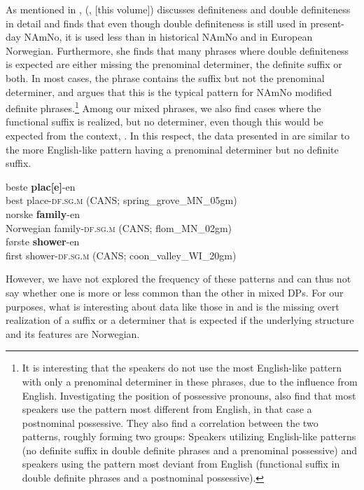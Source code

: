 \documentclass[output=paper]{langscibook}
\begin{document}
As mentioned in , \citeauthor{vanBaal2020} (\citeyear{vanBaal2020}, \citeyear{chapters/vanbaal} [this volume]) discusses definiteness and double definiteness in detail and finds that even though double definiteness is still used in present-day NAmNo, it is used less than in historical NAmNo and in European Norwegian. Furthermore, she finds that many phrases where double definiteness is expected are either missing the prenominal determiner, the definite suffix or both. In most cases, the phrase contains the suffix but not the prenominal determiner, and \citet[218]{vanBaal2020} argues that this is the typical pattern for NAmNo modified definite phrases.\footnote{It is interesting that the speakers do not use the most English-like pattern with only a prenominal determiner in these phrases, due to the influence from English. Investigating the position of possessive pronouns, \citet{AnderssenEtAl2018} also find that most speakers use the pattern most different from English, in that case a postnominal possessive. They also find a correlation between the two patterns, roughly forming two groups: Speakers utilizing English-like patterns (no definite suffix in double definite phrases and a prenominal possessive) and speakers using the pattern most deviant from English (functional suffix in double definite phrases and a postnominal possessive).} Among our mixed phrases, we also find cases where the functional suffix is realized, but no determiner, even though this would be expected from the context, . In this respect, the data presented in  are similar to the more English-like pattern having a prenominal determiner but no definite suffix.


\ea \label{ex:riksem:25}
\ea 
\gll beste \textbf{plac[e]}{}-en\\
	 best place-\textsc{df.sg.m} (CANS; spring\_grove\_MN\_05gm)\\
\ex 
\gll norske \textbf{family}{}-en\\
	 Norwegian family-\textsc{df.sg.m} (CANS; %
     flom\_MN\_02gm)\\
\ex 
\gll første \textbf{shower}{}-en\\
	 first shower-\textsc{df.sg.m} (CANS; %
     coon\_valley\_WI\_20gm)\\
\z
\z



However, we have not explored the frequency of these patterns and can thus not say whether one is more or less common than the other in mixed DPs. For our purposes, what is interesting about data like those in  and  is the missing overt realization of a suffix or a determiner that is expected if the underlying structure and its features are Norwegian.  
\end{document}
